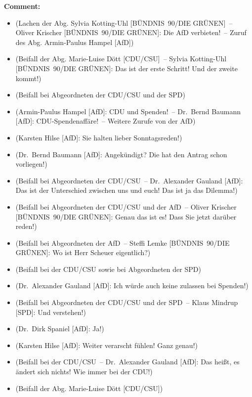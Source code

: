 \documentclass{article}
\begin{document}
\noindent\textbf{Comment:}
\begin{itemize}
    \setlength\itemsep{-3pt}
    \item (Lachen der Abg. Sylvia Kotting-Uhl [BÜNDNIS 90/DIE GRÜNEN] – Oliver Krischer [BÜNDNIS 90/DIE GRÜNEN]: Die AfD verbieten! – Zuruf des Abg. Armin-Paulus Hampel [AfD])
    \setlength\itemsep{-3pt}
    \item (Beifall der Abg. Marie-Luise Dött [CDU/CSU] – Sylvia Kotting-Uhl [BÜNDNIS 90/DIE GRÜNEN]: Das ist der erste Schritt! Und der zweite kommt!)
    \setlength\itemsep{-3pt}
    \item (Beifall bei Abgeordneten der CDU/CSU und der SPD)
    \setlength\itemsep{-3pt}
    \item (Armin-Paulus Hampel [AfD]: CDU und Spenden! – Dr. Bernd Baumann [AfD]: CDU-Spendenaffäre! – Weitere Zurufe von der AfD)
    \setlength\itemsep{-3pt}
    \item (Karsten Hilse [AfD]: Sie halten lieber Sonntagsreden!)
    \setlength\itemsep{-3pt}
    \item (Dr. Bernd Baumann [AfD]: Angekündigt? Die hat den Antrag schon vorliegen!)
    \setlength\itemsep{-3pt}
    \item (Beifall bei Abgeordneten der CDU/CSU – Dr. Alexander Gauland [AfD]: Das ist der Unterschied zwischen uns und euch! Das ist ja das Dilemma!)
    \setlength\itemsep{-3pt}
    \item (Beifall bei Abgeordneten der CDU/CSU und der AfD – Oliver Krischer [BÜNDNIS 90/DIE GRÜNEN]: Genau das ist es! Dass Sie jetzt darüber reden!)
    \setlength\itemsep{-3pt}
    \item (Beifall bei Abgeordneten der AfD – Steffi Lemke [BÜNDNIS 90/DIE GRÜNEN]: Wo ist Herr Scheuer eigentlich?)
    \setlength\itemsep{-3pt}
    \item (Beifall bei der CDU/CSU sowie bei Abgeordneten der SPD)
    \setlength\itemsep{-3pt}
    \item (Dr. Alexander Gauland [AfD]: Ich würde auch keine zulassen bei Spenden!)
    \setlength\itemsep{-3pt}
    \item (Beifall bei Abgeordneten der CDU/CSU und der SPD – Klaus Mindrup [SPD]: Und verstehen!)
    \setlength\itemsep{-3pt}
    \item (Dr. Dirk Spaniel [AfD]: Ja!)
    \setlength\itemsep{-3pt}
    \item (Karsten Hilse [AfD]: Weiter verarscht fühlen! Ganz genau!)
    \setlength\itemsep{-3pt}
    \item (Beifall bei der CDU/CSU – Dr. Alexander Gauland [AfD]: Das heißt, es ändert sich nichts! Wie immer bei der CDU!)
    \setlength\itemsep{-3pt}
    \item (Beifall der Abg. Marie-Luise Dött [CDU/CSU])
\end{itemize}
\end{document}
